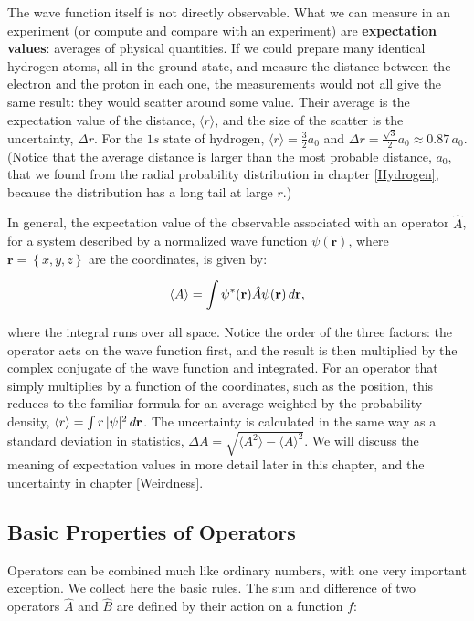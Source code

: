 \documentclass[
  english,
  9pt,
]{extbook}
\theoremstyle{definition}
\theoremstyle{definition}
\theoremstyle{definition}
\theoremstyle{definition}
\theoremstyle{remark}
\begin{document}
The wave function itself is not directly observable. What we can measure in an experiment (or compute and compare with an experiment) are \textbf{expectation values}: averages of physical quantities. If we could prepare many identical hydrogen atoms, all in the ground state, and measure the distance between the electron and the proton in each one, the measurements would not all give the same result: they would scatter around some value. Their average is the expectation value of the distance, \(\langle r\rangle\), and the size of the scatter is the uncertainty, \(\Delta r\). For the \(1s\) state of hydrogen, \(\langle r\rangle=\frac{3}{2}a_0\) and \(\Delta r=\frac{\sqrt{3}}{2}a_0\approx0.87\,a_0\). (Notice that the average distance is larger than the most probable distance, \(a_0\), that we found from the radial probability distribution in chapter \ref{Hydrogen}, because the distribution has a long tail at large \(r\).)

In general, the expectation value of the observable associated with an operator \(\hat{A}\), for a system described by a normalized wave function \(\psi(\mathbf{r})\), where \(\mathbf{r} = \left\{ x,y,z \right\}\) are the coordinates, is given by:

\begin{equation}
\langle A\rangle = \int \psi^{*}({\bf r}) \hat{A} \psi({\bf r})\, d{\bf r},
\label{eq:ee1b}
\end{equation}

where the integral runs over all space. Notice the order of the three factors: the operator acts on the wave function first, and the result is then multiplied by the complex conjugate of the wave function and integrated. For an operator that simply multiplies by a function of the coordinates, such as the position, this reduces to the familiar formula for an average weighted by the probability density, \(\langle r\rangle=\int r\,|\psi|^2\,d{\bf r}\). The uncertainty is calculated in the same way as a standard deviation in statistics, \(\Delta A=\sqrt{\langle A^2\rangle-\langle A\rangle^2}\). We will discuss the meaning of expectation values in more detail later in this chapter, and the uncertainty in chapter \ref{Weirdness}.

\subsection{Basic Properties of Operators}\label{basic-properties-of-operators}

Operators can be combined much like ordinary numbers, with one very important exception. We collect here the basic rules. The sum and difference of two operators \(\hat{A}\) and \(\hat{B}\) are defined by their action on a function \(f\):
\end{document}
